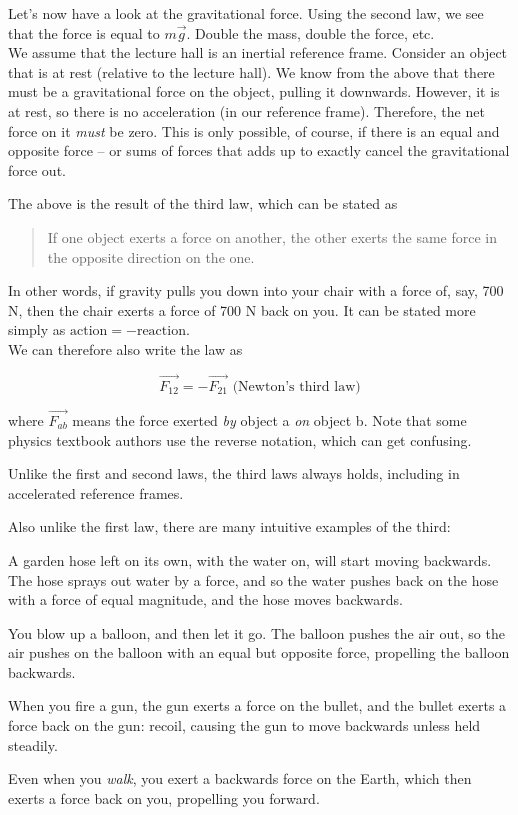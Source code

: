 \documentclass[8.01x]{subfiles}
\begin{document}
Let's now have a look at the gravitational force. Using the second law, we see that the force is equal to $m \vec{g}$. Double the mass, double the force, etc.\\
We assume that the lecture hall is an inertial reference frame. Consider an object that is at rest (relative to the lecture hall). We know from the above that there must be a gravitational force on the object, pulling it downwards. However, it is at rest, so there is no acceleration (in our reference frame). Therefore, the net force on it \emph{must} be zero. This is only possible, of course, if there is an equal and opposite force -- or sums of forces that adds up to exactly cancel the gravitational force out.

The above is the result of the third law, which can be stated as

\begin{quote}
If one object exerts a force on another, the other exerts the same force in the opposite direction on the one.
\end{quote}

In other words, if gravity pulls you down into your chair with a force of, say, 700 N, then the chair exerts a force of 700 N back on you. It can be stated more simply as $\text{action} = -\text{reaction}$.\\
We can therefore also write the law as

\begin{equation}
\vec{F_{12}} = -\vec{F_{21}} \text{ (Newton's third law)} \label{eq:newton3}
\end{equation}

where $\vec{F_{ab}}$ means the force exerted \emph{by} object a \emph{on} object b. Note that some physics textbook authors use the reverse notation, which can get confusing.

Unlike the first and second laws, the third laws always holds, including in accelerated reference frames.

Also unlike the first law, there are many intuitive examples of the third:

\begin{itemize*}
\item A garden hose left on its own, with the water on, will start moving backwards. The hose sprays out water by a force, and so the water pushes back on the hose with a force of equal magnitude, and the hose moves backwards.
\item You blow up a balloon, and then let it go. The balloon pushes the air out, so the air pushes on the balloon with an equal but opposite force, propelling the balloon backwards.
\item When you fire a gun, the gun exerts a force on the bullet, and the bullet exerts a force back on the gun: recoil, causing the gun to move backwards unless held steadily.
\item Even when you \emph{walk}, you exert a backwards force on the Earth, which then exerts a force back on you, propelling you forward.
\end{itemize*}
\end{document}
